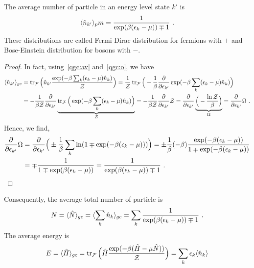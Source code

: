     The average number of particle in an energy level state $k'$ is 
    \begin{equation}\label{fdbe}
        \langle\hat n_{k'}\rangle_pm = \frac{1}{\exp(\beta(\epsilon_k - \mu))\mp 1} ~.
    \end{equation}
    These distributions are called Fermi-Dirac distribution for fermions with $+$ and Bose-Einstein distribution for bosons with $-$.
    \begin{proof}
        In fact, using~\eqref{qgc:av} and~\eqref{qgc:o}, we have
        \begin{equation*}
        \begin{aligned}
            \langle\hat n_{k'}\rangle_{gc} & = \operatorname{tr}_{\mathcal F} \Big (\hat n_{k'} \frac{\exp (-\beta \sum_k (\epsilon_k - \mu) \hat n_k)}{\mathcal Z} \Big) = \frac{1}{\mathcal Z} \operatorname{tr}_{\mathcal F} \Big (- \frac{1}{\beta} \frac{\partial}{\partial\epsilon_{k'}} \exp (-\beta \sum_k (\epsilon_k - \mu) \hat n_k) \Big) \\ & = - \frac{1}{\beta \mathcal Z} \frac{\partial}{\partial\epsilon_{k'}} \underbrace{\operatorname{tr}_{\mathcal F} \Big ( \exp (-\beta \sum_k (\epsilon_k - \mu) \hat n_k) \Big)}_{\mathcal Z} = - \frac{1}{\beta \mathcal Z} \frac{\partial}{\partial\epsilon_{k'}} \mathcal Z = \frac{\partial}{\partial\epsilon_{k'}} \underbrace{\Big ( - \frac{\ln \mathcal Z}{\beta} \Big)}_\Omega = \frac{\partial}{\partial\epsilon_{k'}} \Omega ~.
        \end{aligned}
        \end{equation*}
        Hence, we find, 
        \begin{equation*}
        \begin{aligned}
            \frac{\partial}{\partial\epsilon_{k'}} \Omega & = \frac{\partial}{\partial\epsilon_{k'}}  \Big (\pm \frac{1}{\beta} \sum_k \ln (1 \mp \exp (-\beta (\epsilon_k - \mu)) ) \Big ) = \pm \frac{1}{\beta} (- \beta) \frac{\exp(- \beta(\epsilon_k - \mu))}{1 \mp \exp(- \beta(\epsilon_k - \mu))} \\ & = \mp \frac{1}{1 \mp \exp(\beta(\epsilon_k - \mu))} = \frac{1}{\exp(\beta(\epsilon_k - \mu))\mp 1} ~.
        \end{aligned}
        \end{equation*}
    \end{proof}
    Consequently, the average total number of particle is 
    \begin{equation}\label{qg:n1}
        N = \langle\hat N\rangle_{gc} = \langle\sum_k \hat n_k\rangle_{gc} = \sum_k \frac{1}{\exp(\beta(\epsilon_k - \mu))\mp 1} ~.
    \end{equation}
    The average energy is 
    \begin{equation*}\label{qg:e1}
        E = \langle\hat H\rangle_{gc} = \operatorname{tr}_{\mathcal F} \Big (\hat H \frac{\exp (-\beta (\hat H - \mu \hat N))}{\mathcal Z} \Big) = \sum_k \epsilon_k \langle\hat n_k\rangle
    \end{equation*}
